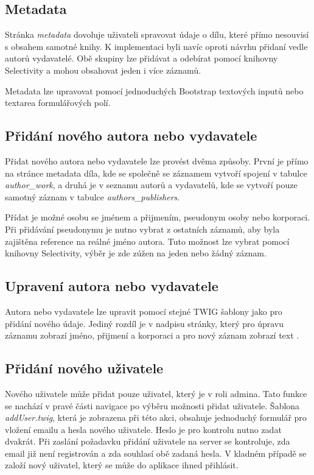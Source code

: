         \subsection{Metadata}
            Stránka \textit{metadata} dovoluje uživateli spravovat údaje o dílu, které přímo nesouvisí s obsahem samotné knihy. K implementaci byli navíc oproti návrhu přidaní vedle autorů vydavatelé. Obě skupiny lze přidávat a odebírat pomocí knihovny Selectivity a mohou obsahovat jeden i více záznamů.
            
            Metadata lze upravovat pomocí jednoduchých Bootstrap textových inputů nebo textarea formulářových polí.
            
        \subsection{Přidání nového autora nebo vydavatele}
            Přidat nového autora nebo vydavatele lze provést dvěma způsoby. První je přímo na stránce metadata díla, kde se společně se záznamem vytvoří spojení v tabulce \textit{author\_work}, a druhá je v seznamu autorů a vydavatelů, kde se vytvoří pouze samotný záznam v tabulce \textit{authors\_publishers}.
            
            Přídat je možné osobu se jménem a přijmením, pseudonym osoby nebo korporaci. Při přidávání pseudonymu je nutno vybrat z ostatních záznamů, aby byla zajištěna reference na reálné jméno autora. Tuto možnost lze vybrat pomocí knihovny Selectivity, výběr je zde zúžen na jeden nebo žádný záznam.
        
        \subsection{Upravení autora nebo vydavatele}
            Autora nebo vydavatele lze upravit pomocí stejné TWIG šablony jako pro přidání nového údaje. Jediný rozdíl je v nadpisu stránky, který pro úpravu záznamu zobrazí jméno, přijmení a korporaci a pro nový záznam zobrazí text .

        \subsection{Přidání nového uživatele}
            Nového uživatele může přidat pouze uživatel, který je v roli admina. Tato funkce se nachází v pravé části navigace po výběru možnosti přidat uživatele. Šablona \textit{addUser.twig}, která je zobrazena při této akci, obsahuje jednoduchý formulář pro vložení emailu a hesla nového uživatele. Heslo je pro kontrolu nutno zadat dvakrát. Při zaslání požadavku přidání uživatele na server se kontroluje, zda email již není registrován a zda souhlasí obě zadaná hesla. V kladném případě se založí nový uživatel, který se může do aplikace ihned přihlásit.
        
